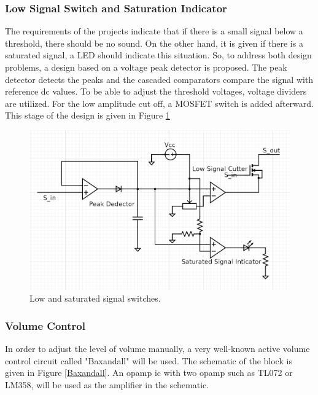 \documentclass[a4paper,10pt]{IEEEtran}
\begin{document}
\subsubsection{Low Signal Switch and Saturation Indicator}
The requirements of the projects indicate that if there is a small signal below a threshold, there should be no sound. On the other hand, it is given if there is a saturated signal, a LED should indicate this situation. So, to address both design problems, a design based on a voltage peak detector is proposed. The peak detector detects the peaks and the cascaded comparators compare the signal with reference dc values. To be able to adjust the threshold voltages, voltage dividers are utilized. For the low amplitude cut off, a MOSFET switch is added afterward. This stage of the design is given in Figure \ref*{saturated_ind} 
\begin{figure}[htbp!]
    \centering
    \includegraphics[width = 0.75\linewidth]{LowSignalSatSignal.png}
    \caption{Low and saturated signal switches.}
    \label{saturated_ind}    
\end{figure} 

\subsubsection{Volume Control}
In order to adjust the level of volume manually, a very well-known active volume control circuit called "Baxandall" will be used. The schematic of the block is given in Figure \ref*{Baxandall}. An opamp ic with two opamp such as TL072 or LM358, will be used as the amplifier in the schematic. 
\end{document}
